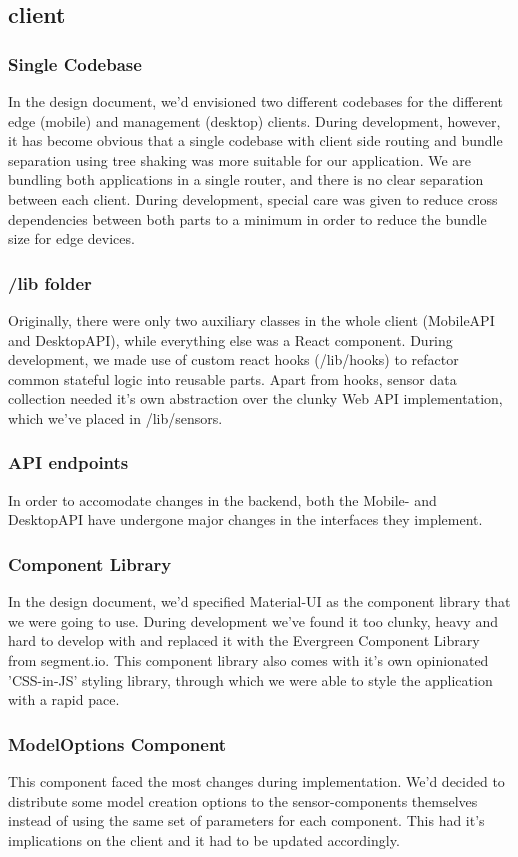 \subsection{client}
\subsubsection{Single Codebase}
In the design document, we'd envisioned two different codebases for the different edge (mobile) and management (desktop) clients. During development, however, it has become obvious that a single codebase with client side routing and bundle separation using tree shaking was more suitable for our application. We are bundling both applications in a single router, and there is no clear separation between each client. During development, special care was given to reduce cross dependencies between both parts to a minimum in order to reduce the bundle size for edge devices.

\subsubsection{/lib folder}
Originally, there were only two auxiliary classes in the whole client (MobileAPI and DesktopAPI), while everything else was a React component. During development, we made use of custom react hooks (/lib/hooks) to refactor common stateful logic into reusable parts. Apart from hooks, sensor data collection needed it's own abstraction over the clunky Web API implementation, which we've placed in /lib/sensors.

\subsubsection{API endpoints}
In order to accomodate changes in the backend, both the Mobile- and DesktopAPI have undergone major changes in the interfaces they implement.

\subsubsection{Component Library}
In the design document, we'd specified Material-UI as the component library that we were going to use. During development we've found it too clunky, heavy and hard to develop with and replaced it with the Evergreen Component Library from segment.io. This component library also comes with it's own opinionated 'CSS-in-JS' styling library, through which we were able to style the application with a rapid pace.

\subsubsection{ModelOptions Component}
This component faced the most changes during implementation. We'd decided to distribute some model creation options to the sensor-components themselves instead of using the same set of parameters for each component. This had it's implications on the client and it had to be updated accordingly.